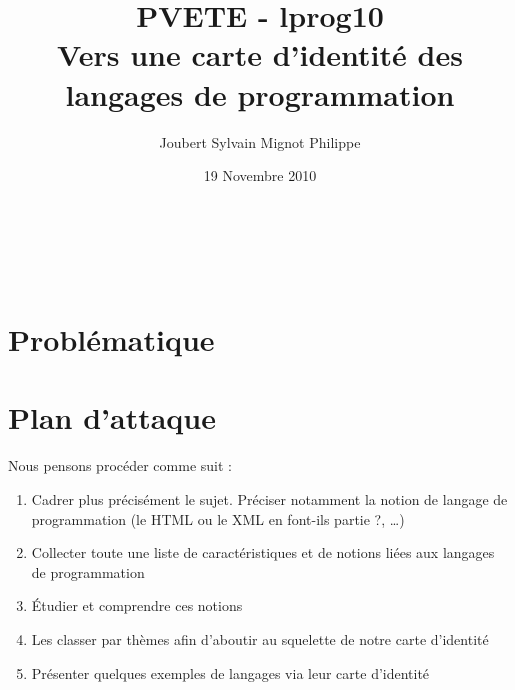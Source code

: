 \documentclass[a4paper, 11pt]{article}
\title{PVETE - lprog10\\
Vers une carte d'identité des langages de programmation}
\author{{\sc Joubert} Sylvain \hspace{1cm} {\sc Mignot} Philippe}
\date{19 Novembre 2010}
\begin{document}

\begin{center}
	\LARGE \thetitle \normalsize \\
	\vspace{2\baselineskip}
	\thedate \\
	\vspace{\baselineskip}
	\theauthor
\end{center}
\vspace*{5em}

\section{Problématique}

\section{Plan d'attaque}
Nous pensons procéder comme suit :

\begin{enumerate}
\item Cadrer plus précisément le sujet. Préciser notamment la notion de langage de programmation (le HTML ou le XML en font-ils partie ?, …)
\item Collecter toute une liste de caractéristiques et de notions liées aux langages de programmation
\item Étudier et comprendre ces notions
\item Les classer par thèmes afin d'aboutir au squelette de notre carte d'identité
\item Présenter quelques exemples de langages via leur carte d'identité
\end{enumerate}
\end{document}
